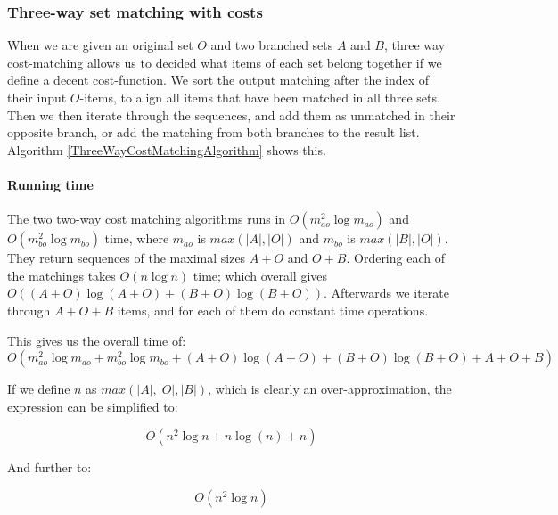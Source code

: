 \documentclass[11pt]{article}
\begin{document}
\subsubsection{Three-way set matching with costs}
When we are given an original set $O$ and two branched sets $A$ and $B$, three way cost-matching allows us to decided what items of each set belong together if we define a decent cost-function. We sort the output matching after the index of their input $O$-items, to align all items that have been matched in all three sets. Then we then iterate through the sequences, and add them as unmatched in their opposite branch, or add the matching from both branches to the result list. Algorithm \ref{ThreeWayCostMatchingAlgorithm} shows this.

\paragraph{Running time} The two two-way cost matching algorithms runs in $O(m_{ao}^2 \log m_{ao})$ and $O(m_{bo}^2 \log m_{bo})$ time, where $m_{ao}$ is $max(|A|, |O|)$ and $m_{bo}$ is $max(|B|, |O|)$. They return sequences of the maximal sizes $A+O$ and $O+B$. Ordering each of the matchings takes $O(n \log n)$ time; which overall gives $O((A+O) \log (A+O) + (B+O) \log (B+O))$. Afterwards we iterate through $A+O+B$ items, and for each of them do constant time operations.

This gives us the overall time of:
\begin{equation}
O(m_{ao}^2 \log m_{ao} + m_{bo}^2 \log m_{bo} + (A+O) \log (A+O) + (B+O) \log (B+O) + A + O + B) \nonumber
\end{equation}

If we define $n$ as $max(|A|, |O|, |B|)$, which is clearly an over-approximation, the expression can be simplified to:

\begin{equation}
O(n^2 \log n + n \log (n) + n) \nonumber
\end{equation}

And further to:

\begin{equation}
O(n^2 \log n) \nonumber
\end{equation}
\end{document}
